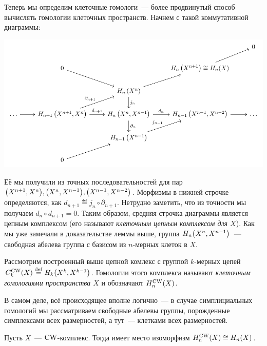     Теперь мы определим клеточные гомологи~--- более продвинутый способ вычислять гомологии клеточных пространств. Начнем с такой коммутативной диаграммы:

    \begin{center}
        \includegraphics{lectures/0/pictures/cd_11}
    \end{center}

    Её мы получили из точных последовательностей для пар $\lr*{X^{n + 1}, X^{n}}, \lr*{X^n, X^{n - 1}}, \lr*{X^{n - 1}, X^{n - 2}}$.
    Морфизмы в нижней строчке определяются, как $d_{n + 1} \eqdef j_n \circ \partial_{n + 1}$. Нетрудно заметить, что из точности мы получаем $d_n \circ d_{n + 1} = 0$.
    Таким образом, средняя строчка диаграммы является цепным комплексом (его называют \emph{клеточным цепным комплексом для $X$}). Как мы уже замечали в доказательстве леммы выше, группа
    $H_{n}\lr*{X^n, X^{n - 1}}$~--- свободная абелева группа с базисом из $n$-мерных клеток в $X$.

    \begin{definition}
        Рассмотрим построенный выше цепной комлекс с группой $k$-мерных цепей $C_{k}^{\CW}(X) \eqdef H_{k}\lr*{X^k, X^{k - 1}}$. Гомологии этого комплекса называют
        \emph{клеточным гомологиями пространства $X$} и обозначают $H_{n}^{\operatorname{CW}}(X)$.
    \end{definition}

    \begin{remark}
       В самом деле, всё происходящее вполне логично~--- в случае симплициальных гомологий мы рассматриваем свободные абелевы группы, порожденные
        симплексами всех размерностей, а тут~--- клетками всех размерностей. 
    \end{remark}

    \begin{theorem}
        Пусть $X$~--- $\operatorname{CW}$-комплекс. Тогда имеет место изоморфизм $H_{n}^{\operatorname{CW}}(X) \cong H_{n}(X)$.
    \end{theorem}

